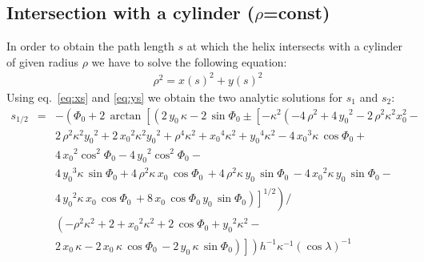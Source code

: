 \documentclass[twoside]{article}
\begin{document}
\subsection{Intersection with a cylinder ($\rho$=const)}

In order to obtain the path length $s$ at which the helix
intersects with a cylinder of given radius $\rho$ we have to solve
the following equation:
\begin{eqnarray}
    \rho^2 = x(s)^2 + y(s)^2
\end{eqnarray}
Using eq.~\ref{eq:xs} and \ref{eq:ys} we obtain the two analytic solutions for $s_1$ and $s_2$:
\begin{eqnarray} \label{eq:rsolve}
    s_{1/2} &=& -\left({\Phi_0}+2\,\arctan \left[
            \left(2\,{y_0}\,\kappa-2\,\sin{\Phi_0} \pm \left[ -
                    \kappa^2\left (-4\,\rho^2+4\,{y_0}^2 - 2\,\rho^2\kappa^2 x_0^2 -  
                    \right. \right. \right. \right. \right. \\ \nonumber
    & & \left. \left. \left. \left. \left.
                        2\,\rho^2 \kappa^2 {y_0}^{2} + 2\,{{x_0}}^{2}{\kappa}^{2}{
                            {y_0}}^{2}+{\rho}^{4}{\kappa}^{2}+{{x_0}}^{4}{\kappa}^{2}+{{y_0}}^{4}{
                            \kappa}^{2}-4\,{{x_0}}^{3}\kappa\,\cos{\Phi_0} +
                    \right. \right. \right. \right. \right. \\ \nonumber
    & & \left. \left. \left. \left. \left.
                        4\,{{x_0}}^{2}\cos^2{\Phi_0} - 4\,{{y_0}}^{2} \cos^{2}{\Phi_0} -
                    \right. \right. \right. \right. \right. \\ \nonumber
    & & \left. \left. \left. \left. \left.
                        4\,{{y_0}}
                        ^{3}\kappa\,\sin{\Phi_0}+4\,{\rho}^{2}\kappa\,{x_0}\,\cos{\Phi_0}\, + 4\,{\rho}^{2}\kappa
                        \,{y_0}\,\sin{\Phi_0}\, -4\,{{x_0}}^{2}\kappa\,{y_0}\,\sin{\Phi_0} -
                    \right. \right. \right. \right. \right. \\ \nonumber
    & & \left. \left. \left. \left. \left.
                        4\,{{y_0}}^{2}\kappa\,{x_0}\,\cos{\Phi_0}\, +8\,{x_0}\,\cos{\Phi_0}\,{y_0}\,\sin{\Phi_0}
                    \right ) \right]^{1/2} \right) /
        \right. \right. \\ \nonumber
    & & \left. \left.
            \left(
                -{\rho}^{2}{\kappa}^{2}+2+{x_0}^{2}{\kappa}^{2}+2\,\cos{\Phi_0}+{y_0}^{2}{\kappa}^{2} -
            \right. \right. \right. \\ \nonumber
    & & \left. \left. \left.
                2\,{x_0}\,\kappa-2\,{x_0}\,\kappa\,\cos{\Phi_0}\,
                -2\,{y_0}\,\kappa\,\sin{\Phi_0} \right)
        \right] \right){h}^{-1}{\kappa}^{-1}\left (
        \cos\lambda\right )^{-1}
\end{eqnarray}
\end{document}
